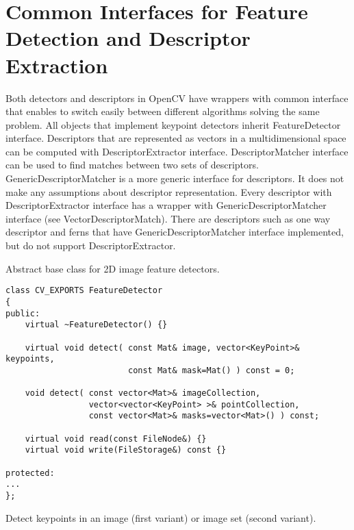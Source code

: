 \section{Common Interfaces for Feature Detection and Descriptor Extraction}
Both detectors and descriptors in OpenCV have wrappers with common interface that enables to switch easily 
between different algorithms solving the same problem. All objects that implement keypoint detectors inherit 
FeatureDetector interface. Descriptors that are represented as vectors in a multidimensional space can be 
computed with DescriptorExtractor interface. DescriptorMatcher interface can be used to find matches between 
two sets of descriptors. GenericDescriptorMatcher is a more generic interface for descriptors. It does not make any 
assumptions about descriptor representation. Every descriptor with DescriptorExtractor interface has a wrapper with 
GenericDescriptorMatcher interface (see VectorDescriptorMatch). There are descriptors such as one way descriptor and 
ferns that have GenericDescriptorMatcher interface implemented, but do not support DescriptorExtractor.

Abstract base class for 2D image feature detectors.

\begin{lstlisting}
class CV_EXPORTS FeatureDetector
{
public:
    virtual ~FeatureDetector() {}
    
    virtual void detect( const Mat& image, vector<KeyPoint>& keypoints, 
                         const Mat& mask=Mat() ) const = 0;
    
    void detect( const vector<Mat>& imageCollection, 
                 vector<vector<KeyPoint> >& pointCollection, 
                 const vector<Mat>& masks=vector<Mat>() ) const;

    virtual void read(const FileNode&) {}
    virtual void write(FileStorage&) const {}

protected:
...
};
\end{lstlisting}

Detect keypoints in an image (first variant) or image set (second variant).



